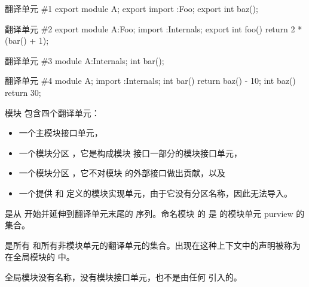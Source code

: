 \pnum
\begin{example}
\begin{codeblocktu}{翻译单元 \#1}
export module A;
export import :Foo;
export int baz();
\end{codeblocktu}

\begin{codeblocktu}{翻译单元 \#2}
export module A:Foo;
import :Internals;
export int foo() { return 2 * (bar() + 1); }
\end{codeblocktu}

\begin{codeblocktu}{翻译单元 \#3}
module A:Internals;
int bar();
\end{codeblocktu}

\begin{codeblocktu}{翻译单元 \#4}
module A;
import :Internals;
int bar() { return baz() - 10; }
int baz() { return 30; }
\end{codeblocktu}

模块  包含四个翻译单元：
\begin{itemize}
\item 一个主模块接口单元，
\item 一个模块分区 ，它是构成模块  接口一部分的模块接口单元，
\item 一个模块分区 ，它不对模块  的外部接口做出贡献，以及
\item 一个提供  和  定义的模块实现单元，由于它没有分区名称，因此无法导入。
\end{itemize}
\end{example}

\pnum
{} 是从  开始并延伸到翻译单元末尾的  序列。命名模块  的  是  的模块单元 purview 的集合。

\pnum
{} 是所有  和所有非模块单元的翻译单元的集合。出现在这种上下文中的声明被称为在全局模块的  中。
\begin{note}
全局模块没有名称，没有模块接口单元，也不是由任何  引入的。
\end{note}

